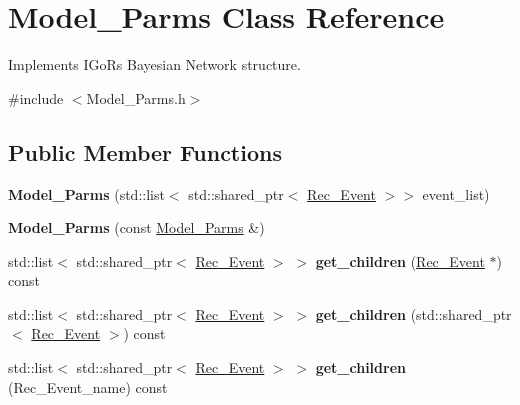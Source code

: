 \hypertarget{classModel__Parms}{}\section{Model\+\_\+\+Parms Class Reference}
\label{classModel__Parms}


Implements I\+GoR\textquotesingle{}s Bayesian Network structure.  




{\ttfamily \#include $<$Model\+\_\+\+Parms.\+h$>$}

\subsection*{Public Member Functions}
\begin{DoxyCompactItemize}
\item 
\mbox{\label{classModel__Parms_ac4f3da8649c2fe192428eb5ee06f750e}} 
{\bfseries Model\+\_\+\+Parms} (std\+::list$<$ std\+::shared\+\_\+ptr$<$ \hyperlink{classRec__Event}{Rec\+\_\+\+Event} $>$$>$ event\+\_\+list)
\item 
\mbox{\label{classModel__Parms_addb5234c48577ff55c8109b7eac39f90}} 
{\bfseries Model\+\_\+\+Parms} (const \hyperlink{classModel__Parms}{Model\+\_\+\+Parms} \&)
\item 
\mbox{\label{classModel__Parms_af2e0e7e78112ab006df73263c030a8a2}} 
std\+::list$<$ std\+::shared\+\_\+ptr$<$ \hyperlink{classRec__Event}{Rec\+\_\+\+Event} $>$ $>$ {\bfseries get\+\_\+children} (\hyperlink{classRec__Event}{Rec\+\_\+\+Event} $\ast$) const
\item 
\mbox{\label{classModel__Parms_aca4f6ee88cb9b1e698fedd3568ed2d42}} 
std\+::list$<$ std\+::shared\+\_\+ptr$<$ \hyperlink{classRec__Event}{Rec\+\_\+\+Event} $>$ $>$ {\bfseries get\+\_\+children} (std\+::shared\+\_\+ptr$<$ \hyperlink{classRec__Event}{Rec\+\_\+\+Event} $>$) const
\item 
\mbox{\label{classModel__Parms_a7155a456f861e9dd637559cde8e02629}} 
std\+::list$<$ std\+::shared\+\_\+ptr$<$ \hyperlink{classRec__Event}{Rec\+\_\+\+Event} $>$ $>$ {\bfseries get\+\_\+children} (Rec\+\_\+\+Event\+\_\+name) const
\item 
\mbox{\label{classModel__Parms_a86aa613ae499f4dc488988b1d94190ef}} 
$$
\end{DoxyCompactItemize}
